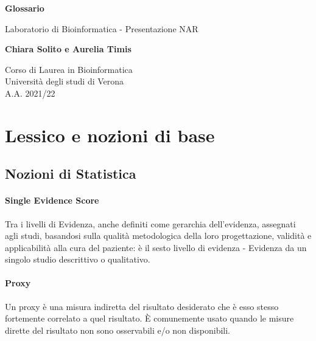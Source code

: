 \documentclass{article}
\begin{document}
\newcommand\tab[1][0.3cm]{\hspace*{#1}}


\begin{titlepage}
    \begin{center}
        \vspace*{1cm}
            
        \Huge
        \textbf{Glossario}
            
        \vspace{0.5cm}
        \LARGE
        Laboratorio di Bioinformatica - Presentazione NAR
            
        \vspace{1.5cm}
            
        \textbf{Chiara Solito e Aurelia Timis}

        \vspace{0.8cm}

            
        \Large
        Corso di Laurea in Bioinformatica\\
        Università degli studi di Verona\\
        A.A. 2021/22
            
    \end{center}
\end{titlepage}

\newpage
\thispagestyle{empty}
\section{Lessico e nozioni di base}
\subsection*{Nozioni di Statistica}
\paragraph{Single Evidence Score}
Tra i livelli di Evidenza, anche definiti come gerarchia dell'evidenza, assegnati agli studi, basandosi sulla qualità metodologica della loro progettazione, validità e applicabilità alla cura del paziente: è il sesto livello di evidenza - Evidenza da un singolo studio descrittivo o qualitativo.
\paragraph{Proxy}Un proxy è una misura indiretta del risultato desiderato che è esso stesso fortemente correlato a quel risultato. È comunemente usato quando le misure dirette del risultato non sono osservabili e/o non disponibili.
\end{document}
